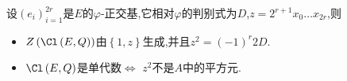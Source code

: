 \begin{remark}{}{}
	设$\left(e_{i}\right)_{i=1}^{2r}$是$E$的$\varphi$-正交基,它相对$\varphi$的判别式为$D$,$z=2^{r+1}x_{0}\ldots x_{2r}$,则
	\begin{itemize}
		\item $Z\left(\Cl\left(E,Q\right)\right)$由$\left\{1,z\right\}$生成,并且$z^{2}=\left(-1\right)^{r}2D$.
		\item $\Cl\left(E,Q\right)$是单代数$\iff$ $z^{2}$不是$A$中的平方元.
	\end{itemize}
\end{remark}


















